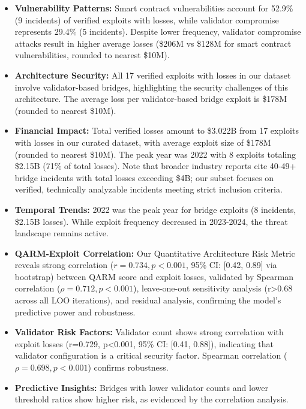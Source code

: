 \documentclass[runningheads]{llncs}
\begin{document}
\begin{itemize}
    \item \textbf{Vulnerability Patterns:} Smart contract vulnerabilities account for 52.9\% (9 incidents) of verified exploits with losses, while validator compromise represents 29.4\% (5 incidents). Despite lower frequency, validator compromise attacks result in higher average losses (\$206M vs \$128M for smart contract vulnerabilities, rounded to nearest \$10M).
    
    \item \textbf{Architecture Security:} All 17 verified exploits with losses in our dataset involve validator-based bridges, highlighting the security challenges of this architecture. The average loss per validator-based bridge exploit is \$178M (rounded to nearest \$10M).
    
    \item \textbf{Financial Impact:} Total verified losses amount to \$3.022B from 17 exploits with losses in our curated dataset, with average exploit size of \$178M (rounded to nearest \$10M). The peak year was 2022 with 8 exploits totaling \$2.15B (71\% of total losses). Note that broader industry reports cite 40-49+ bridge incidents with total losses exceeding \$4B; our subset focuses on verified, technically analyzable incidents meeting strict inclusion criteria.
    
    \item \textbf{Temporal Trends:} 2022 was the peak year for bridge exploits (8 incidents, \$2.15B losses). While exploit frequency decreased in 2023-2024, the threat landscape remains active.
    
    \item \textbf{QARM-Exploit Correlation:} Our Quantitative Architecture Risk Metric reveals strong correlation ($r=0.734, p<0.001$, 95\% CI: [0.42, 0.89] via bootstrap) between QARM score and exploit losses, validated by Spearman correlation ($\rho=0.712, p<0.001$), leave-one-out sensitivity analysis (r>0.68 across all LOO iterations), and residual analysis, confirming the model's predictive power and robustness.
    
    \item \textbf{Validator Risk Factors:} Validator count shows strong correlation with exploit losses (r=0.729, p<0.001, 95\% CI: [0.41, 0.88]), indicating that validator configuration is a critical security factor. Spearman correlation ($\rho=0.698, p<0.001$) confirms robustness.
    
    \item \textbf{Predictive Insights:} Bridges with lower validator counts and lower threshold ratios show higher risk, as evidenced by the correlation analysis.
\end{itemize}
\end{document}
